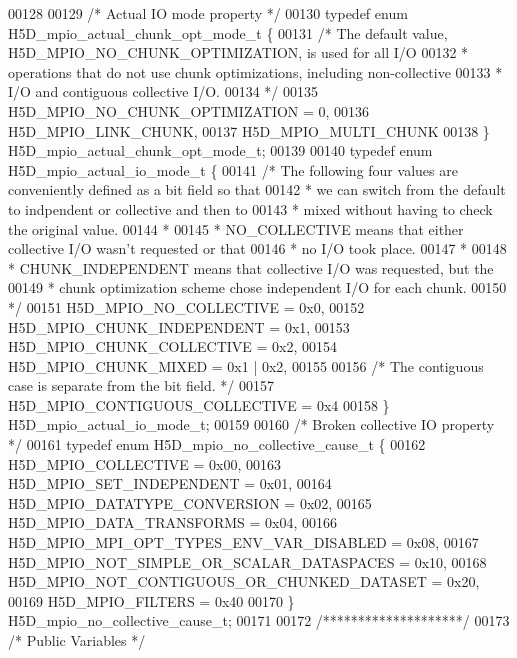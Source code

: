 \begin{DoxyCode}
00128 
00129 \textcolor{comment}{/* Actual IO mode property */}
00130 \textcolor{keyword}{typedef} \textcolor{keyword}{enum} H5D\_mpio\_actual\_chunk\_opt\_mode\_t \{
00131     \textcolor{comment}{/* The default value, H5D\_MPIO\_NO\_CHUNK\_OPTIMIZATION, is used for all I/O}
00132 \textcolor{comment}{     * operations that do not use chunk optimizations, including non-collective}
00133 \textcolor{comment}{     * I/O and contiguous collective I/O.}
00134 \textcolor{comment}{     */}
00135     H5D\_MPIO\_NO\_CHUNK\_OPTIMIZATION = 0,
00136     H5D\_MPIO\_LINK\_CHUNK,
00137     H5D\_MPIO\_MULTI\_CHUNK
00138 \}  H5D\_mpio\_actual\_chunk\_opt\_mode\_t;
00139 
00140 \textcolor{keyword}{typedef} \textcolor{keyword}{enum} H5D\_mpio\_actual\_io\_mode\_t \{
00141     \textcolor{comment}{/* The following four values are conveniently defined as a bit field so that}
00142 \textcolor{comment}{     * we can switch from the default to indpendent or collective and then to}
00143 \textcolor{comment}{     * mixed without having to check the original value. }
00144 \textcolor{comment}{     * }
00145 \textcolor{comment}{     * NO\_COLLECTIVE means that either collective I/O wasn't requested or that }
00146 \textcolor{comment}{     * no I/O took place.}
00147 \textcolor{comment}{     *}
00148 \textcolor{comment}{     * CHUNK\_INDEPENDENT means that collective I/O was requested, but the}
00149 \textcolor{comment}{     * chunk optimization scheme chose independent I/O for each chunk.}
00150 \textcolor{comment}{     */}
00151     H5D\_MPIO\_NO\_COLLECTIVE = 0x0,
00152     H5D\_MPIO\_CHUNK\_INDEPENDENT = 0x1,
00153     H5D\_MPIO\_CHUNK\_COLLECTIVE = 0x2,
00154     H5D\_MPIO\_CHUNK\_MIXED = 0x1 | 0x2,
00155 
00156     \textcolor{comment}{/* The contiguous case is separate from the bit field. */}
00157     H5D\_MPIO\_CONTIGUOUS\_COLLECTIVE = 0x4
00158 \} H5D\_mpio\_actual\_io\_mode\_t; 
00159 
00160 \textcolor{comment}{/* Broken collective IO property */}
00161 \textcolor{keyword}{typedef} \textcolor{keyword}{enum} H5D\_mpio\_no\_collective\_cause\_t \{
00162     H5D\_MPIO\_COLLECTIVE = 0x00,
00163     H5D\_MPIO\_SET\_INDEPENDENT = 0x01,
00164     H5D\_MPIO\_DATATYPE\_CONVERSION = 0x02,
00165     H5D\_MPIO\_DATA\_TRANSFORMS = 0x04,
00166     H5D\_MPIO\_MPI\_OPT\_TYPES\_ENV\_VAR\_DISABLED = 0x08,
00167     H5D\_MPIO\_NOT\_SIMPLE\_OR\_SCALAR\_DATASPACES = 0x10,
00168     H5D\_MPIO\_NOT\_CONTIGUOUS\_OR\_CHUNKED\_DATASET = 0x20,
00169     H5D\_MPIO\_FILTERS = 0x40
00170 \} H5D\_mpio\_no\_collective\_cause\_t;
00171 
00172 \textcolor{comment}{/********************/}
00173 \textcolor{comment}{/* Public Variables */}

\end{DoxyCode}
